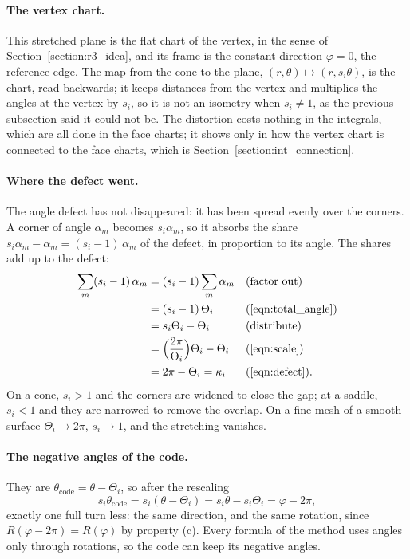 \paragraph{The vertex chart.} This stretched plane is the flat chart of the vertex, in the sense of Section~\ref{section:r3_idea}, and its frame is the constant direction $\varphi = 0$, the reference edge. The map from the cone to the plane, $(r, \theta) \mapsto (r, s_i\theta)$, is the chart, read backwards; it keeps distances from the vertex and multiplies the angles at the vertex by $s_i$, so it is not an isometry when $s_i \ne 1$, as the previous subsection said it could not be. The distortion costs nothing in the integrals, which are all done in the face charts; it shows only in how the vertex chart is connected to the face charts, which is Section~\ref{section:int_connection}.

\paragraph{Where the defect went.} The angle defect has not disappeared: it has been spread evenly over the corners. A corner of angle $\alpha_m$ becomes $s_i \alpha_m$, so it absorbs the share $s_i\alpha_m - \alpha_m = (s_i - 1)\, \alpha_m$ of the defect, in proportion to its angle. The shares add up to the defect:
\begin{align*}
\sum_m (s_i - 1)\,\alpha_m &= (s_i - 1)\sum_m \alpha_m && \text{(factor out)} \\
&= (s_i - 1)\,\Theta_i && \text{(\ref{eqn:total_angle})} \\
&= s_i\Theta_i - \Theta_i && \text{(distribute)} \\
&= \Big(\frac{2\pi}{\Theta_i}\Big)\Theta_i - \Theta_i && \text{(\ref{eqn:scale})} \\ &= 2\pi - \Theta_i = \kappa_i && \text{(\ref{eqn:defect}).}
\end{align*}
On a cone, $s_i > 1$ and the corners are widened to close the gap; at a saddle, $s_i < 1$ and they are narrowed to remove the overlap. On a fine mesh of a smooth surface $\Theta_i \to 2\pi$, $s_i \to 1$, and the stretching vanishes.

\paragraph{The negative angles of the code.} They are $\theta_{\text{code}} = \theta - \Theta_i$, so after the rescaling
\begin{equation*}
s_i\theta_{\text{code}} = s_i(\theta - \Theta_i) = s_i\theta - s_i\Theta_i = \varphi - 2\pi ,
\end{equation*}
exactly one full turn less: the same direction, and the same rotation, since $R(\varphi - 2\pi) = R(\varphi)$ by property (c). Every formula of the method uses angles only through rotations, so the code can keep its negative angles.

